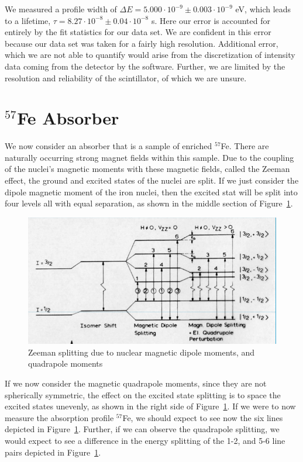 \documentclass[paper=a4, fontsize=11pt, abstract=on]{scrartcl} %
\numberwithin{equation}{section}
\numberwithin{figure}{section}
\numberwithin{table}{section}
\begin{document}
We measured a profile width of $\Delta E = 5.000 \cdot 10^{-9} \pm 0.003 \cdot 10^{-9}$ eV, which
leads to a lifetime, $\tau = 8.27 \cdot 10^{-8} \pm 0.04\cdot 10^{-8}$
s. Here our error is accounted for entirely by the fit statistics for
our data set. We are confident in this error because our data set was
taken for a fairly high resolution. Additional error, which we are not
able to quantify would arise from the discretization of intensity data
coming from the detector by the software. Further, we are limited by
the resolution and reliability of the scintillator, of which we are unsure. 


\section{$^{57}$Fe Absorber}
\label{sec:iron}

We now consider an absorber that is a sample of enriched
$^{57}$Fe. There are naturally occurring strong magnet fields within
this sample. Due to the coupling of the nuclei's magnetic moments with
these magnetic fields, called the Zeeman effect, the ground and
excited states of the nuclei are split. If we just consider the dipole
magnetic moment of the iron nuclei, then the excited stat will be
split into four levels all with equal separation, as shown in the
middle section of Figure~\ref{fig:dipsplit}.

\begin{figure}[h]
  \centering
  \includegraphics[width=.65\textwidth]{splits}
  \caption{Zeeman splitting due to nuclear magnetic dipole moments,
    and quadrapole moments \cite{art:slides}} 
  \label{fig:dipsplit}
\end{figure}

\vline

If we now consider the magnetic quadrapole moments, since they are not
spherically symmetric, the effect on the excited state splitting is to
space the excited states unevenly, as shown in the right side of
Figure~\ref{fig:dipsplit}. If we were to now measure the absorption
profile $^{57}$Fe, we should expect to see now the six lines depicted
in Figure~\ref{fig:dipsplit}. Further, if we can observe the
quadrapole splitting, we would expect to see a difference in the
energy splitting of the 1-2,  and 5-6 line pairs depicted in Figure~\ref{fig:dipsplit}.
\end{document}

